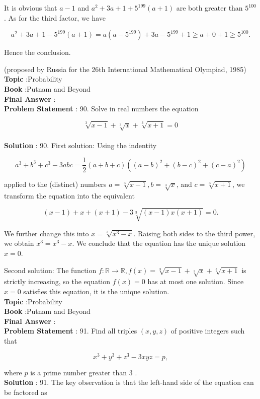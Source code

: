 \documentclass[10pt]{article}
\begin{document}
It is obvious that $a-1$ and $a^{2}+3 a+1+5^{199}(a+1)$ are both greater than $5^{100}$. As for the third factor, we have

$$
a^{2}+3 a+1-5^{199}(a+1)=a\left(a-5^{199}\right)+3 a-5^{199}+1 \geq a+0+1 \geq 5^{100} .
$$

Hence the conclusion.

(proposed by Russia for the 26th International Mathematical Olympiad, 1985)
\\
\textbf{Topic} :Probability\\
\textbf{Book} :Putnam and Beyond\\
\textbf{Final Answer} :\\


\textbf{Problem Statement} :
90. Solve in real numbers the equation

$$
\sqrt[3]{x-1}+\sqrt[3]{x}+\sqrt[3]{x+1}=0
$$
\\
\textbf{Solution} :
90. First solution: Using the indentity

$$
a^{3}+b^{3}+c^{3}-3 a b c=\frac{1}{2}(a+b+c)\left((a-b)^{2}+(b-c)^{2}+(c-a)^{2}\right)
$$

applied to the (distinct) numbers $a=\sqrt[3]{x-1}, b=\sqrt[3]{x}$, and $c=\sqrt[3]{x+1}$, we transform the equation into the equivalent

$$
(x-1)+x+(x+1)-3 \sqrt[3]{(x-1) x(x+1)}=0 .
$$

We further change this into $x=\sqrt[3]{x^{3}-x}$. Raising both sides to the third power, we obtain $x^{3}=x^{3}-x$. We conclude that the equation has the unique solution $x=0$.

Second solution: The function $f: \mathbb{R} \rightarrow \mathbb{R}, f(x)=\sqrt[3]{x-1}+\sqrt[3]{x}+\sqrt[3]{x+1}$ is strictly increasing, so the equation $f(x)=0$ has at most one solution. Since $x=0$ satisfies this equation, it is the unique solution.
\\
\textbf{Topic} :Probability\\
\textbf{Book} :Putnam and Beyond\\
\textbf{Final Answer} :\\


\textbf{Problem Statement} :
91. Find all triples $(x, y, z)$ of positive integers such that

$$
x^{3}+y^{3}+z^{3}-3 x y z=p,
$$

where $p$ is a prime number greater than 3 .
\\
\textbf{Solution} :
91. The key observation is that the left-hand side of the equation can be factored as
\end{document}

